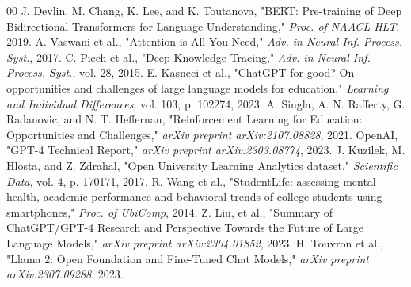 \documentclass[conference]{IEEEtran}
\begin{document}
\begin{thebibliography}{00}
 J. Devlin, M. Chang, K. Lee, and K. Toutanova, "BERT: Pre-training of Deep Bidirectional Transformers for Language Understanding," \textit{Proc. of NAACL-HLT}, 2019.
 A. Vaswani et al., "Attention is All You Need," \textit{Adv. in Neural Inf. Process. Syst.}, 2017.
 C. Piech et al., "Deep Knowledge Tracing," \textit{Adv. in Neural Inf. Process. Syst.}, vol. 28, 2015.
 E. Kasneci et al., "ChatGPT for good? On opportunities and challenges of large language models for education," \textit{Learning and Individual Differences}, vol. 103, p. 102274, 2023.
 A. Singla, A. N. Rafferty, G. Radanovic, and N. T. Heffernan, "Reinforcement Learning for Education: Opportunities and Challenges," \textit{arXiv preprint arXiv:2107.08828}, 2021.
 OpenAI, "GPT-4 Technical Report," \textit{arXiv preprint arXiv:2303.08774}, 2023.
 J. Kuzilek, M. Hlosta, and Z. Zdrahal, "Open University Learning Analytics dataset," \textit{Scientific Data}, vol. 4, p. 170171, 2017.
 R. Wang et al., "StudentLife: assessing mental health, academic performance and behavioral trends of college students using smartphones," \textit{Proc. of UbiComp}, 2014.
 Z. Liu, et al., "Summary of ChatGPT/GPT-4 Research and Perspective Towards the Future of Large Language Models," \textit{arXiv preprint arXiv:2304.01852}, 2023.
 H. Touvron et al., "Llama 2: Open Foundation and Fine-Tuned Chat Models," \textit{arXiv preprint arXiv:2307.09288}, 2023.
\end{thebibliography}
\end{document}
